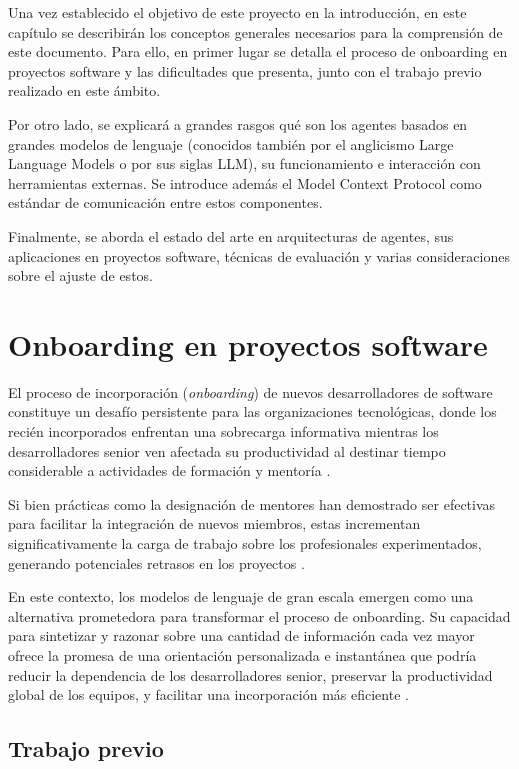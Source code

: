 Una vez establecido el objetivo de este proyecto en la introducción, en este capítulo se describirán los conceptos generales necesarios para la comprensión de este documento. Para ello, en primer lugar se detalla el proceso de onboarding en proyectos software y las dificultades que presenta, junto con el trabajo previo realizado en este ámbito.

Por otro lado, se explicará a grandes rasgos qué son los agentes basados en grandes modelos de lenguaje (conocidos también por el anglicismo Large Language Models o por sus siglas LLM), su funcionamiento e interacción con herramientas externas. Se introduce además el Model Context Protocol como estándar de comunicación entre estos componentes.

Finalmente, se aborda el estado del arte en arquitecturas de agentes, sus aplicaciones en proyectos software, técnicas de evaluación y varias consideraciones sobre el ajuste de estos.

\section{Onboarding en proyectos software}
El proceso de incorporación (\textit{onboarding}) de nuevos desarrolladores de software constituye un desafío persistente para las organizaciones tecnológicas, donde los recién incorporados enfrentan una sobrecarga informativa mientras los desarrolladores senior ven afectada su productividad al destinar tiempo considerable a actividades de formación y mentoría \cite{sim_ramp-up_1998}. 

Si bien prácticas como la designación de mentores han demostrado ser efectivas para facilitar la integración de nuevos miembros, estas incrementan significativamente la carga de trabajo sobre los profesionales experimentados, generando potenciales retrasos en los proyectos \cite{steinmacher_systematic_2015}.

En este contexto, los modelos de lenguaje de gran escala emergen como una alternativa prometedora para transformar el proceso de onboarding. Su capacidad para sintetizar y razonar sobre una cantidad de información cada vez mayor ofrece la promesa de una orientación personalizada e instantánea que podría reducir la dependencia de los desarrolladores senior, preservar la productividad global de los equipos, y facilitar una incorporación más eficiente \cite{ritz_artificial_2023}.

\subsection{Trabajo previo}
\label{sec:trabajo_previo}

